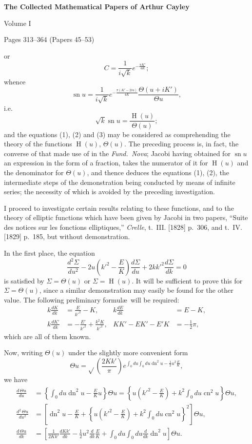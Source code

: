 \documentclass[12pt,a4paper]{article}
\theoremstyle{plain}
\DeclareMathOperator{\sn}{sn}
\DeclareMathOperator{\cn}{cn}
\DeclareMathOperator{\dn}{dn}
\DeclareMathOperator{\Hf}{H}
\begin{document}
\begin{center}
\Large\bfseries The Collected Mathematical Papers of Arthur Cayley

\medskip
\large Volume I

\medskip
\normalsize Pages 313--364 (Papers 45--53)
\end{center}

\tableofcontents
\newpage


or
\[
C = \frac{1}{i\sqrt{k}} e^{-\frac{\pi K'}{4K}};
\]
whence
\[
\sn u = \frac{1}{i\sqrt{k}} e^{-\frac{\pi(K' - 2iu)}{4K}} \frac{\Theta(u + iK')}{\Theta u},
\]
i.e.
\[
\sqrt{k} \sn u = \frac{\Hf(u)}{\Theta(u)} \tag{3};
\]
and the equations (1), (2) and (3) may be considered as comprehending the theory of the functions $\Hf(u)$, $\Theta(u)$. The preceding process is, in fact, the converse of that made use of in the \textit{Fund.~Nova}; Jacobi having obtained for $\sn u$ an expression in the form of a fraction, takes the numerator of it for $\Hf(u)$ and the denominator for $\Theta(u)$, and thence deduces the equations (1), (2), the intermediate steps of the demonstration being conducted by means of infinite series; the necessity of which is avoided by the preceding investigation.

I proceed to investigate certain results relating to these functions, and to the theory of elliptic functions which have been given by Jacobi in two papers, ``Suite des notices sur les fonctions elliptiques,'' \textit{Crelle}, t.~III. [1828] p.~306, and t.~IV. [1829] p.~185, but without demonstration.

In the first place, the equation
\[
\frac{d^2 \Sigma}{du^2} - 2u\left(k'^2 - \frac{E}{K}\right)\frac{d\Sigma}{du} + 2kk'^2 \frac{d\Sigma}{dk} = 0 \tag{4}
\]
is satisfied by $\Sigma = \Theta(u)$ or $\Sigma = \Hf(u)$. It will be sufficient to prove this for $\Sigma = \Theta(u)$, since a similar demonstration may easily be found for the other value. The following preliminary formul\ae\ will be required:
\begin{align*}
k \frac{dK}{dk} &= \frac{E}{k'^2} - K, & k \frac{dE}{dk} &= E - K, \\
k \frac{dK'}{dk} &= -\frac{E'}{k'^2} + \frac{k^2 K}{k'^2}, & KK' - EK' - E'K &= -\tfrac{1}{2}\pi,
\end{align*}
which are all of them known.

Now, writing $\Theta(u)$ under the slightly more convenient form
\[
\Theta u = \sqrt{}\left(\frac{2Kk'}{\pi}\right) e^{\int_0 du \int_0 du \dn^2 u - \frac{1}{2}u^2 \frac{E}{K}},
\]
we have
\begin{align*}
\frac{d\, \Theta u}{du} &= \left\{\int_0 du \dn^2 u - \frac{E}{K}u\right\} \Theta u = \left\{u\left(k'^2 - \frac{E}{K}\right) + k^2 \int_0 du \cn^2 u\right\} \Theta u, \\
\frac{d^2\, \Theta u}{du^2} &= \left[\dn^2 u - \frac{E}{K} + \left\{u\left(k'^2 - \frac{E}{K}\right) + k^2 \int_0 du \cn^2 u\right\}^2\right] \Theta u, \\
\frac{d\, \Theta u}{dk} &= \left[\frac{1}{2Kk'}\frac{dKk'}{dk} - \tfrac{1}{2}u^2 \frac{d}{dk}\frac{E}{K} + \int_0 du \int_0 du \frac{d}{dk} \dn^2 u\right] \Theta u.
\end{align*}
\end{document}
